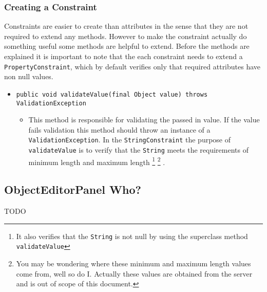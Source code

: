 \documentclass[10pt,letterpaper,onecolumn,oneside]{report}
\begin{document}
\subsubsection{Creating a Constraint}
Constraints are easier to create than attributes in the sense that they are not
required to extend any methods.  However to make the constraint actually do
something useful some methods are helpful to extend.  Before the methods
are explained it is important to note that the each constraint needs to extend
a \texttt{PropertyConstraint}, which by default verifies only that required
attributes have non null values.
\begin{itemize}
\item \texttt{public void validateValue(final Object value) throws 
ValidationException}
\begin{itemize}
\item This method is responsible for validating the passed in value.  If the
value fails validation this method should throw an instance of a
\texttt{ValidationException}.  In the \texttt{StringConstraint} the purpose
of \texttt{validateValue} is to verify that the \texttt{String} meets the
requirements of minimum length and maximum length
\footnote{It also verifies that the \texttt{String} is not null by using the superclass method \texttt{validateValue}}
\footnote{You may be wondering where these minimum and maximum length values 
come from, well so do I.  Actually these values are obtained from the server
and is out of scope of this document.}
.
\end{itemize}
\end{itemize}
\subsection{ObjectEditorPanel Who?}
TODO
\end{document}
